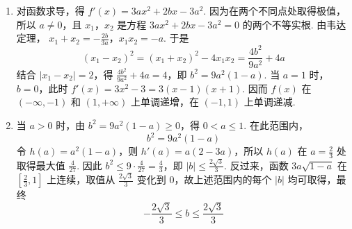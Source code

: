 \begin{solution}
\begin{enumerate}
\item 对函数求导，得 \(f'(x)=3ax^2+2bx-3a^2\). 因为在两个不同点处取得极值，所以 \(a\neq0\)，且 \(x_1\)，\(x_2\) 是方程 \(3ax^2+2bx-3a^2=0\) 的两个不等实根. 由韦达定理，
\(x_1+x_2=-\frac{2b}{3a}\)，\(x_1x_2=-a\).
于是
\[
(x_1-x_2)^2=(x_1+x_2)^2-4x_1x_2=\frac{4b^2}{9a^2}+4a
\]
结合 \(\lvert x_1-x_2\rvert=2\)，得 \(\frac{4b^2}{9a^2}+4a=4\)，即 \(b^2=9a^2(1-a)\). 当 \(a=1\) 时，\(b=0\)，此时 \(f'(x)=3x^2-3=3(x-1)(x+1)\). 因而 \(f(x)\) 在 \((-\infty,-1)\) 和 \((1,+\infty)\) 上单调递增，在 \((-1,1)\) 上单调递减.

\item 当 \(a>0\) 时，由 \(b^2=9a^2(1-a)\geqslant0\)，得 \(0<a\leqslant1\). 在此范围内，
\[
b^2=9a^2(1-a)
\]
令 \(h(a)=a^2(1-a)\)，则 \(h'(a)=a(2-3a)\)，所以 \(h(a)\) 在 \(a=\frac{2}{3}\) 处取得最大值 \(\frac{4}{27}\). 因此 \(b^2\leqslant9\cdot\frac{4}{27}=\frac{4}{3}\)，即 \(\lvert b\rvert\leqslant\frac{2\sqrt{3}}{3}\). 反过来，函数 \(3a\sqrt{1-a}\) 在 \(\left[\frac{2}{3},1\right]\) 上连续，取值从 \(\frac{2\sqrt{3}}{3}\) 变化到 \(0\)，故上述范围内的每个 \(\lvert b\rvert\) 均可取得，最终
\[
-\frac{2\sqrt{3}}{3}\leqslant b\leqslant\frac{2\sqrt{3}}{3}
\]
\end{enumerate}
\end{solution}
